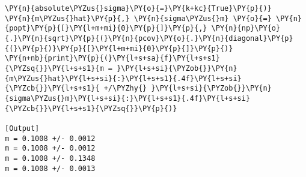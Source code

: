 \begin{Verbatim}[label=\makebox{\href{https://bitbucket.org/lbaldini/statnotes/src/master/snippets/absolute\_sigma.py}{https://bitbucket.org/.../absolute\_sigma.py}},commandchars=\\\{\}]
                       \PY{n}{absolute\PYZus{}sigma}\PY{o}{=}\PY{k+kc}{True}\PY{p}{)}
\PY{n}{m\PYZus{}hat}\PY{p}{,} \PY{n}{sigma\PYZus{}m} \PY{o}{=} \PY{n}{popt}\PY{p}{[}\PY{l+m+mi}{0}\PY{p}{]}\PY{p}{,} \PY{n}{np}\PY{o}{.}\PY{n}{sqrt}\PY{p}{(}\PY{n}{pcov}\PY{o}{.}\PY{n}{diagonal}\PY{p}{(}\PY{p}{)}\PY{p}{[}\PY{l+m+mi}{0}\PY{p}{]}\PY{p}{)}
\PY{n+nb}{print}\PY{p}{(}\PY{l+s+sa}{f}\PY{l+s+s1}{\PYZsq{}}\PY{l+s+s1}{m = }\PY{l+s+si}{\PYZob{}}\PY{n}{m\PYZus{}hat}\PY{l+s+si}{:}\PY{l+s+s1}{.4f}\PY{l+s+si}{\PYZcb{}}\PY{l+s+s1}{ +/\PYZhy{} }\PY{l+s+si}{\PYZob{}}\PY{n}{sigma\PYZus{}m}\PY{l+s+si}{:}\PY{l+s+s1}{.4f}\PY{l+s+si}{\PYZcb{}}\PY{l+s+s1}{\PYZsq{}}\PY{p}{)}

[Output]
m = 0.1008 +/- 0.0012
m = 0.1008 +/- 0.0012
m = 0.1008 +/- 0.1348
m = 0.1008 +/- 0.0013
\end{Verbatim}